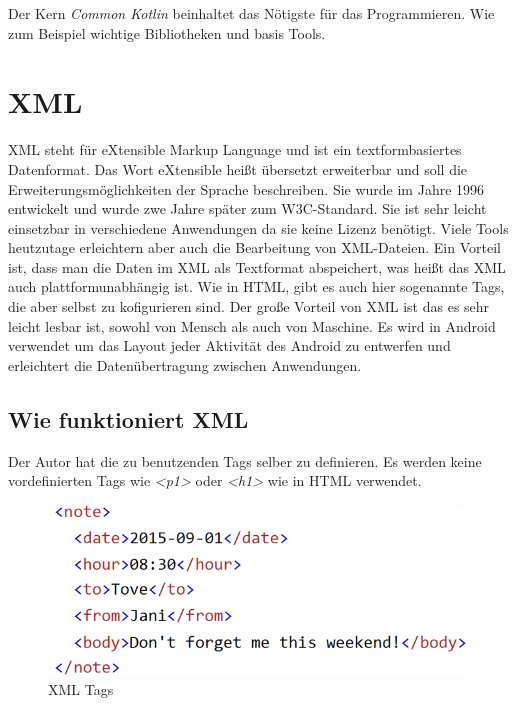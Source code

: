 Der Kern \textit{Common Kotlin} beinhaltet das  Nötigste für das Programmieren. Wie zum Beispiel wichtige Bibliotheken
und basis Tools.


\pagebreak

\section{XML}
\cite{XML1}
\cite{XML2}
\author{Bozidar Spasenovic}
XML steht für eXtensible Markup Language und ist ein textformbasiertes Datenformat.
Das Wort eXtensible heißt übersetzt erweiterbar und soll die Erweiterungsmöglichkeiten der Sprache beschreiben.
\linebreak
Sie wurde im Jahre 1996 entwickelt und wurde zwe Jahre später zum W3C-Standard. 
Sie ist sehr leicht einsetzbar in verschiedene Anwendungen da sie keine Lizenz benötigt.
Viele Tools heutzutage erleichtern aber auch die Bearbeitung von XML-Dateien.
\linebreak
Ein Vorteil ist, dass man die Daten im XML als Textformat abspeichert, was heißt das XML auch plattformunabhängig ist.
Wie in HTML, gibt es auch hier sogenannte Tags, die aber selbst zu kofigurieren sind. 
Der große Vorteil von XML ist das es sehr leicht lesbar ist, sowohl von Mensch als auch von Maschine.
Es wird in Android verwendet um das Layout jeder Aktivität des Android zu entwerfen und erleichtert die Datenübertragung zwischen Anwendungen.

\subsection{Wie funktioniert XML}

Der Autor hat die zu benutzenden Tags selber zu definieren. Es werden keine vordefinierten Tags wie \textit{<p1>} oder \textit{<h1>} wie in HTML verwendet.

\begin{figure}[htp]
    \author{Bozidar Spasenovic}
    \centering
    \includegraphics[scale=0.80]{pics/xml-tags.png}
    \caption{XML Tags}
    \label{fig:impl:XML-Tags}
\end{figure}   


